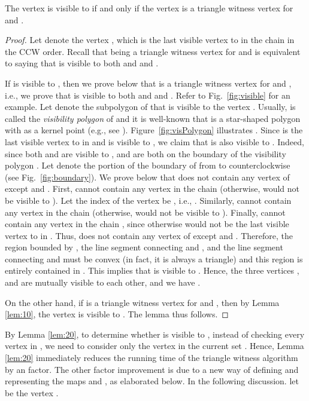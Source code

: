 \documentclass[11pt]{article}
\def\lemmaspace{\vspace*{0in}}
\begin{document}
\lemmaspace
\begin{lemma}\label{lem:20}
The vertex  is visible to  if and only if the vertex
 is a triangle witness vertex for  and . 
\end{lemma}
\lemmaspace
\begin{proof}
Let  denote the vertex , which is the last visible vertex
to  in the chain  in the CCW order.
Recall that  being a triangle witness vertex for  and 
is equivalent to saying that  is visible to both  and  and 
. 


If  is visible to , then we prove below that  is a triangle
witness vertex for  and , i.e., we prove that  is visible to both  and
 and
. 
Refer to Fig.~\ref{fig:visible} for an example. 
Let  denote the subpolygon of  that is visible to
the vertex . Usually,  is called the {\em visibility
polygon} of  and it is well-known that  is
a star-shaped polygon with  as a kernel point
(e.g., see \cite{ref:AsanoVi00}). Figure~\ref{fig:visPolygon}
illustrates .
Since  is the last visible vertex to  in
 and  is visible to , we claim that
 is also visible to . Indeed, since both  and  are visible to , 
and  are both on the boundary of the visibility polygon .  
Let  denote the portion of the boundary of  from  to
 counterclockwise (see Fig.~\ref{fig:boundary}). 
We prove below that  does not contain
any vertex of  except  and .
First,  cannot contain any vertex in the chain
 (otherwise,  would not be visible to
). Let the index of the vertex  be , i.e.,
. Similarly,  cannot contain any vertex in the chain
 (otherwise,  would not be visible to
). Finally,  cannot contain any vertex in the chain
, since otherwise  would not be the last
visible vertex to  in . Thus,  does
not contain any vertex of  except  and . Therefore, the
region bounded by , the line segment connecting  and
, and the line segment connecting  and  must be convex (in fact,
it is always a triangle) and this region is entirely contained in .  This
implies that  is visible to . 
Hence, the three vertices , and  are mutually visible to each
other, and we have 
. 

On the other hand, if  is a triangle witness vertex 
for  and , then by Lemma
\ref{lem:10}, the vertex  is visible to . The lemma thus
follows.  
\end{proof}

By Lemma \ref{lem:20}, to determine whether  is visible to
, instead of checking every vertex in , we
need to consider only the vertex  in the current set . 
Hence, Lemma \ref{lem:20} immediately reduces the running time of the triangle
witness algorithm by an  factor. The other  factor
improvement is due to a new way of defining and representing the maps  and
, as elaborated below. In the following discussion.
let  be the vertex . 
\end{document}
